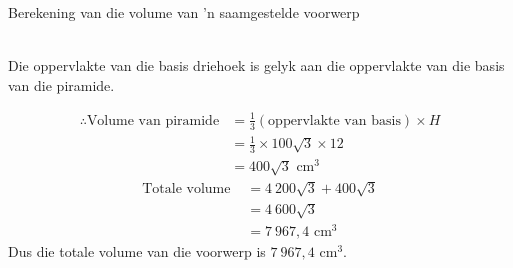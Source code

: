 \begin{wex}{Berekening van die volume van 'n saamgestelde voorwerp}
{
\\
Die oppervlakte van die basis driehoek is gelyk aan die oppervlakte van die basis van die piramide.

\begin{align*}
\therefore \mbox{Volume van piramide} &= \frac{1}{3} (\mbox{oppervlakte van basis}) \times H\\
&= \frac{1}{3} \times 100 \sqrt{3} \times 12 \\

&=400\sqrt{3}\mbox{ cm}^3
\end{align*}
\begin{align*}
\mbox{Totale volume } &= 4~200\sqrt{3}+400\sqrt{3}\\
&= 4~600 \sqrt{3}\\
&=7~967,4\mbox{ cm}^3
\end{align*}
Dus die totale volume van die voorwerp is $7~967,4 \mbox{ cm}^3$.
}
\end{wex}

